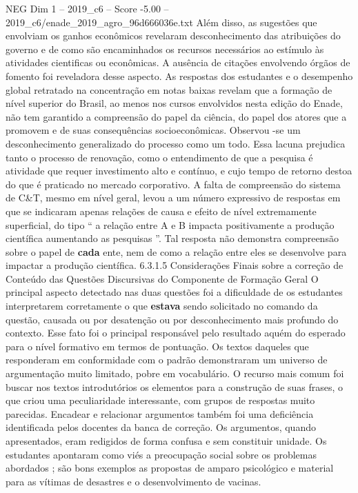 \begin{textsample}{NEG Dim 1 – 2019\_c6 – Score -5.00 – 2019\_c6/enade\_2019\_agro\_96d666036e.txt}
Além disso, as sugestões que envolviam os ganhos econômicos revelaram desconhecimento das atribuições do governo e de como são encaminhados os recursos necessários ao estímulo às atividades cientificas ou econômicas.
A ausência de citações envolvendo órgãos de fomento foi reveladora desse aspecto.
As respostas dos estudantes e o desempenho global retratado na concentração em notas baixas revelam que a formação de nível superior do Brasil, ao menos nos cursos envolvidos nesta edição do Enade, não tem garantido a compreensão do papel da ciência, do papel dos atores que a promovem e de suas consequências socioeconômicas.
Observou -se um desconhecimento generalizado do processo como um todo.
Essa lacuna prejudica tanto o processo de renovação, como o entendimento de que a pesquisa é atividade que requer investimento alto e contínuo, e cujo tempo de retorno destoa do que é praticado no mercado corporativo.
A falta de compreensão do sistema de C\&T, mesmo em nível geral, levou a um número expressivo de respostas em que se indicaram apenas relações de causa e efeito de nível extremamente superficial, do tipo “ a relação entre A e B impacta positivamente a produção científica aumentando as pesquisas ”.
Tal resposta não demonstra compreensão sobre o papel de \textbf{cada} ente, nem de como a relação entre eles se desenvolve para impactar a produção científica. 6.3.1.5 Considerações Finais sobre a correção de Conteúdo das Questões Discursivas do Componente de Formação Geral O principal aspecto detectado nas duas questões foi a dificuldade de os estudantes interpretarem corretamente o que \textbf{estava} sendo solicitado no comando da questão, causada ou por desatenção ou por desconhecimento mais profundo do contexto.
Esse fato foi o principal responsável pelo resultado aquém do esperado para o nível formativo em termos de pontuação.
Os textos daqueles que responderam em conformidade com o padrão demonstraram um universo de argumentação muito limitado, pobre em vocabulário.
O recurso mais comum foi buscar nos textos introdutórios os elementos para a construção de suas frases, o que criou uma peculiaridade interessante, com grupos de respostas muito parecidas.
Encadear e relacionar argumentos também foi uma deficiência identificada pelos docentes da banca de correção.
Os argumentos, quando apresentados, eram redigidos de forma confusa e sem constituir unidade.
Os estudantes apontaram como viés a preocupação social sobre os problemas abordados ; são bons exemplos as propostas de amparo psicológico e material para as vítimas de desastres e o desenvolvimento de vacinas.

\end{textsample}
